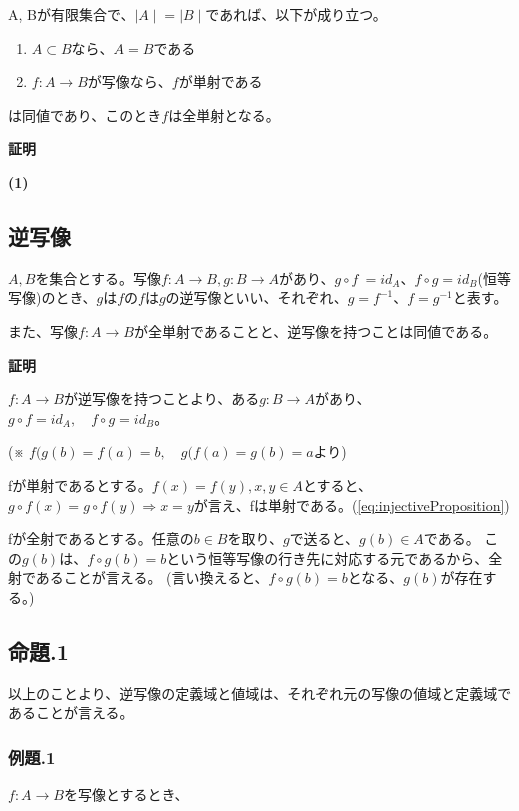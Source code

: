\documentclass[dvipdfmx,autodetect-engine]{jsarticle}
\begin{document}
A, Bが有限集合で、${\mid A \mid} = {\mid B \mid}$であれば、以下が成り立つ。
\begin{enumerate}
\item $A \subset B$なら、$A = B$である
\item $f: A \to B$が写像なら、$f$が単射である
\end{enumerate}

は同値であり、このとき$f$は全単射となる。

{\bf 証明}

{\bf (1)}


\subsection{逆写像}

$A, B$を集合とする。写像$f: A \to B, g: B \to A$があり、$g \circ f\ = id_{A}、f \circ g = id_{B}$(恒等写像)のとき、$g$は$f$の$f$は$g$の逆写像といい、それぞれ、$g = f^{-1}$、$f = g^{-1}$と表す。

また、写像$f:A \to B$が全単射であることと、逆写像を持つことは同値である。

{ \bf 証明 }

$f: A \to B$が逆写像を持つことより、ある$g: B \to A$があり、$g \circ f = id_{A}, \quad f \circ g = id_{B}$。

(※ $f(g(b) = f(a) = b, \quad g(f(a) = g(b) = a$より)

fが単射であるとする。$f(x) = f(y), x,y \in A$とすると、$g \circ f(x) = g \circ f(y) \Rightarrow x = y$が言え、fは単射である。(\ref{eq:injectiveProposition})

fが全射であるとする。任意の$b \in B$を取り、$g$で送ると、$g(b) \in A$である。
この$g(b)$は、$f \circ g(b) = b$という恒等写像の行き先に対応する元であるから、全射であることが言える。
(言い換えると、$f \circ g(b) = b$となる、$g(b)$が存在する。)

\subsection { 命題.1 }

以上のことより、逆写像の定義域と値域は、それぞれ元の写像の値域と定義域であることが言える。

\subsubsection { 例題.1 }

$f:A \to B$を写像とするとき、
\end{document}
